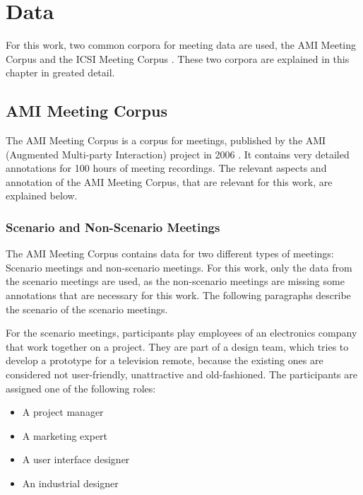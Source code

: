 \chapter{Data}\label{ch:data}

For this work, two common corpora for meeting data are used, the AMI Meeting Corpus \cite{Mccowan05theami} and the ICSI Meeting Corpus \cite{Janin}.
These two corpora are explained in this chapter in greated detail.


\section{AMI Meeting Corpus}\label{sec:ami-meeting-corpus}

The AMI Meeting Corpus is a corpus for meetings, published by the AMI (Augmented Multi-party Interaction) project in 2006 \cite{Mccowan05theami}.
It contains very detailed annotations for 100 hours of meeting recordings.
The relevant aspects and annotation of the AMI Meeting Corpus, that are relevant for this work, are explained below.

\subsection{Scenario and Non-Scenario Meetings}

The AMI Meeting Corpus contains data for two different types of meetings: Scenario meetings and non-scenario meetings.
For this work, only the data from the scenario meetings are used, as the non-scenario meetings are missing some annotations that are necessary for this work. %
The following paragraphs describe the scenario of the scenario meetings.

For the scenario meetings, participants play employees of an electronics company that work together on a project.
They are part of a design team, which tries to develop a prototype for a television remote, because the existing ones are considered not user-friendly, unattractive and old-fashioned.
The participants are assigned one of the following roles:
\begin{itemize}
\item A project manager
\item A marketing expert
\item A user interface designer
\item An industrial designer
\end{itemize}

